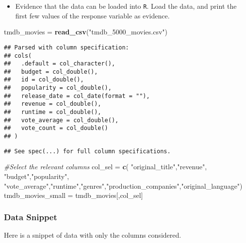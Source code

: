 \documentclass[
]{article}
\newenvironment{Shaded}{\begin{snugshade}}{\end{snugshade}}
\newcommand{\CommentTok}[1]{\textcolor[rgb]{0.56,0.35,0.01}{\textit{#1}}}
\newcommand{\KeywordTok}[1]{\textcolor[rgb]{0.13,0.29,0.53}{\textbf{#1}}}
\newcommand{\NormalTok}[1]{#1}
\newcommand{\StringTok}[1]{\textcolor[rgb]{0.31,0.60,0.02}{#1}}
\providecommand{\tightlist}{%
  \setlength{\itemsep}{0pt}\setlength{\parskip}{0pt}}
\begin{document}
\begin{itemize}
\tightlist
\item
  Evidence that the data can be loaded into \texttt{R}. Load the data,
  and print the first few values of the response variable as evidence.
\end{itemize}

\begin{Shaded}
\begin{Highlighting}[]
\NormalTok{tmdb_movies =}\StringTok{ }\KeywordTok{read_csv}\NormalTok{(}\StringTok{"tmdb_5000_movies.csv"}\NormalTok{)}
\end{Highlighting}
\end{Shaded}

\begin{verbatim}
## Parsed with column specification:
## cols(
##   .default = col_character(),
##   budget = col_double(),
##   id = col_double(),
##   popularity = col_double(),
##   release_date = col_date(format = ""),
##   revenue = col_double(),
##   runtime = col_double(),
##   vote_average = col_double(),
##   vote_count = col_double()
## )
\end{verbatim}

\begin{verbatim}
## See spec(...) for full column specifications.
\end{verbatim}

\begin{Shaded}
\begin{Highlighting}[]
\CommentTok{#Select the relevant columns }
\NormalTok{col_sel =}\StringTok{ }\KeywordTok{c}\NormalTok{( }\StringTok{"original_title"}\NormalTok{,}\StringTok{"revenue"}\NormalTok{, }\StringTok{"budget"}\NormalTok{,}\StringTok{"popularity"}\NormalTok{, }\StringTok{"vote_average"}\NormalTok{,}\StringTok{"runtime"}\NormalTok{,}\StringTok{"genres"}\NormalTok{,}\StringTok{"production_companies"}\NormalTok{,}\StringTok{"original_language"}\NormalTok{)}
\NormalTok{tmdb_movies_small =}\StringTok{ }\NormalTok{tmdb_movies[,col_sel]}
\end{Highlighting}
\end{Shaded}

\hypertarget{data-snippet}{%
\subsubsection{Data Snippet}\label{data-snippet}}

Here is a snippet of data with only the columns considered.
\end{document}
